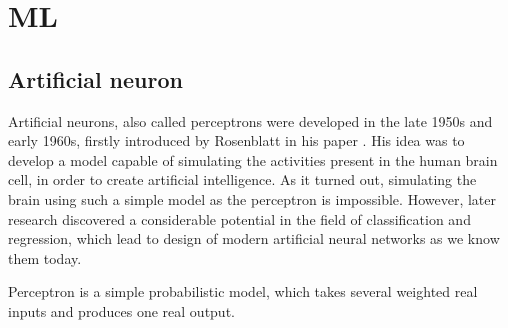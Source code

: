 \chapter{ML}

\section{Artificial neuron}

Artificial neurons, also called perceptrons were developed in the late 1950s and early 1960s, firstly introduced by Rosenblatt in his paper \cite{perceptron}. His idea was to develop a model capable of simulating the activities present in the human brain cell, in order to create artificial intelligence. As it turned out, simulating the brain using such a simple model as the perceptron is impossible. However, later research discovered a considerable potential in the field of classification and regression, which lead to design of modern artificial neural networks as we know them today.

Perceptron is a simple probabilistic model, which takes several weighted real inputs and produces one real output.

\vspace{3mm}

